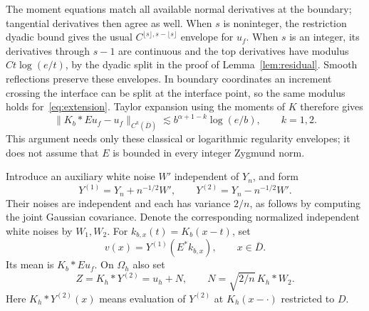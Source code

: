 \documentclass[11pt]{article}
\theoremstyle{remark}
\newcommand{\norm}[1]{\lVert #1\rVert}
\begin{document}
The moment equations match all available normal derivatives at the boundary; tangential derivatives then agree as well. When $s$ is noninteger, the restriction dyadic bound gives the usual $C^{\lfloor s\rfloor,s-\lfloor s\rfloor}$ envelope for $u_f$. When $s$ is an integer, its derivatives through $s-1$ are continuous and the top derivatives have modulus $Ct\log(e/t)$, by the dyadic split in the proof of Lemma~\ref{lem:residual}. Smooth reflections preserve these envelopes. In boundary coordinates an increment crossing the interface can be split at the interface point, so the same modulus holds for~\eqref{eq:extension}. Taylor expansion using the moments of $K$ therefore gives
\begin{equation}\label{eq:pilotbias}
 \norm{K_b*Eu_f-u_f}_{C^k(\overline D)}
 \lesssim b^{\alpha+1-k}\log(e/b),\qquad k=1,2.
\end{equation}
This argument needs only these classical or logarithmic regularity envelopes; it does not assume that $E$ is bounded in every integer Zygmund norm.

Introduce an auxiliary white noise $W'$ independent of $Y_n$, and form
\begin{equation}\label{eq:split}
 Y^{(1)}=Y_n+n^{-1/2}W',\qquad
 Y^{(2)}=Y_n-n^{-1/2}W'.
\end{equation}
Their noises are independent and each has variance $2/n$, as follows by computing the joint Gaussian covariance.  Denote the corresponding normalized independent white noises by $W_1,W_2$. For $k_{b,x}(t)=K_b(x-t)$, set
\begin{equation}\label{eq:pilot}
 v(x)=Y^{(1)}(E^*k_{b,x}),\qquad x\in\overline D.
\end{equation}
Its mean is $K_b*Eu_f$. On $\Omega_h$ also set
\begin{equation}\label{eq:Z}
 Z=K_h*Y^{(2)}=u_h+N,\qquad N=\sqrt{2/n}\,K_h*W_2.
\end{equation}
Here $K_h*Y^{(2)}(x)$ means evaluation of $Y^{(2)}$ at $K_h(x-\cdot)$ restricted to $D$.
\end{document}
